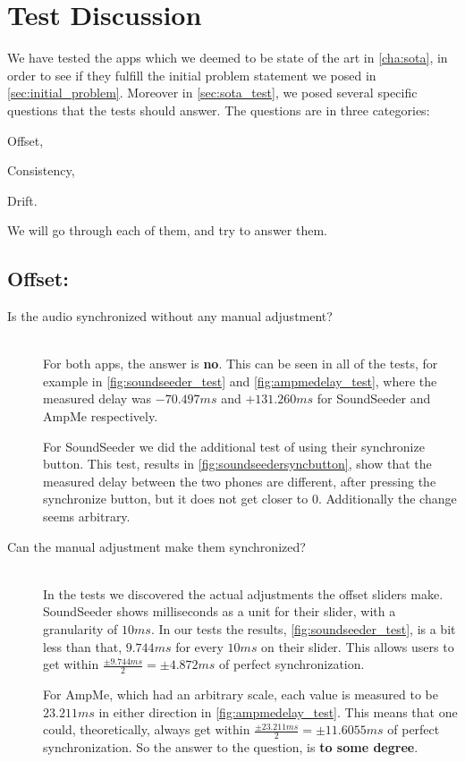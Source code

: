 \section{Test Discussion}

We have tested the apps which we deemed to be state of the art in \cref{cha:sota}, in order to see if they fulfill the initial problem statement we posed in \vref{sec:initial_problem}.
Moreover in \vref{sec:sota_test}, we posed several specific questions that the tests should answer. 
The questions are in three categories: 
\begin{enumerate*}[label=(\alph*)]
    \item Offset,
    \item Consistency,
    \item Drift.
\end{enumerate*}
We will go through each of them, and try to answer them.

\subsection*{Offset:}
\begin{description}
    \item[Is the audio synchronized without any manual adjustment?] \hfill \\
    For both apps, the answer is \textbf{no}. 
    This can be seen in all of the tests, for example in \vref{fig:soundseeder_test} and \vref{fig:ampmedelay_test}, where the measured delay was $-70.497 ms$ and $+131.260 ms$ for SoundSeeder and AmpMe respectively.
    
    For SoundSeeder we did the additional test of using their synchronize button. 
    This test, results in \vref{fig:soundseedersyncbutton}, show that the measured delay between the two phones are different, after pressing the synchronize button, but it does not get closer to $0$. 
    Additionally the change seems arbitrary.  
    \item[Can the manual adjustment make them synchronized?] \hfill \\
    In the tests we discovered the actual adjustments the offset sliders make. 
    SoundSeeder shows milliseconds as a unit for their slider, with a granularity of $10 ms$.
    In our tests the results, \vref{fig:soundseeder_test}, is a bit less than that, $9.744 ms$ for every $10 ms$ on their slider.
    This allows users to get within $\frac{\pm9.744 ms}{2}=\pm 4.872 ms$ of perfect synchronization.
    
    For AmpMe, which had an arbitrary scale, each value is measured to be $23.211 ms$ in either direction in \vref{fig:ampmedelay_test}.
    This means that one could, theoretically, always get within $\frac{\pm23.211 ms}{2}=\pm 11.6055 ms$ of perfect synchronization. 
    So the answer to the question, is \textbf{to some degree}.
\end{description}


